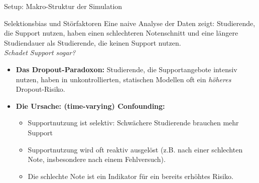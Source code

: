 \documentclass[12pt]{beamer}
\begin{document}
\begin{frame}{Setup: Makro-Struktur der Simulation}
{
    }
\end{frame}

\begin{frame}{Selektionsbias und Störfaktoren}
Eine naive Analyse der Daten zeigt: Studierende, die Support nutzen, haben einen schlechteren Notenschnitt und eine längere Studiendauer als Studierende, die keinen Support nutzen.\\
    \vspace{0.3cm}
\emph{Schadet Support sogar?}    
    \begin{itemize}
        \item \textbf{Das Dropout-Paradoxon:} Studierende, die Supportangebote intensiv nutzen, haben in unkontrollierten, statischen Modellen oft ein \textit{höheres} Dropout-Risiko.
        \vspace{0.2cm}
        \item \textbf{Die Ursache: (time-varying) Confounding:}
        \begin{itemize}
	\item Supportnutzung ist selektiv: Schwächere Studierende brauchen mehr Support
            \item Supportnutzung wird oft reaktiv ausgelöst (z.B. nach einer schlechten Note, insbesondere nach einem Fehlversuch).
            \item Die schlechte Note ist ein Indikator für ein bereits erhöhtes Risiko.
        \end{itemize}
    \end{itemize}
\end{frame}
\end{document}
